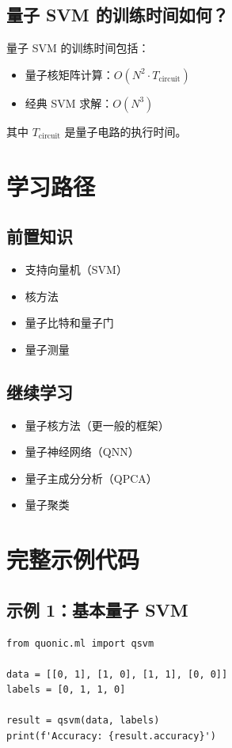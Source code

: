 \documentclass[12pt,a4paper]{article}
\begin{document}
\subsection{量子 SVM 的训练时间如何？}

量子 SVM 的训练时间包括：
\begin{itemize}
  \item 量子核矩阵计算：$O(N^2 \cdot T_{\text{circuit}})$
  \item 经典 SVM 求解：$O(N^3)$
\end{itemize}

其中 $T_{\text{circuit}}$ 是量子电路的执行时间。

\section{学习路径}

\subsection{前置知识}
\begin{itemize}
  \item 支持向量机（SVM）
  \item 核方法
  \item 量子比特和量子门
  \item 量子测量
\end{itemize}

\subsection{继续学习}
\begin{itemize}
  \item 量子核方法（更一般的框架）
  \item 量子神经网络（QNN）
  \item 量子主成分分析（QPCA）
  \item 量子聚类
\end{itemize}

\section{完整示例代码}

\subsection{示例 1：基本量子 SVM}

\begin{verbatim}
from quonic.ml import qsvm

data = [[0, 1], [1, 0], [1, 1], [0, 0]]
labels = [0, 1, 1, 0]

result = qsvm(data, labels)
print(f'Accuracy: {result.accuracy}')
\end{verbatim}
\end{document}

